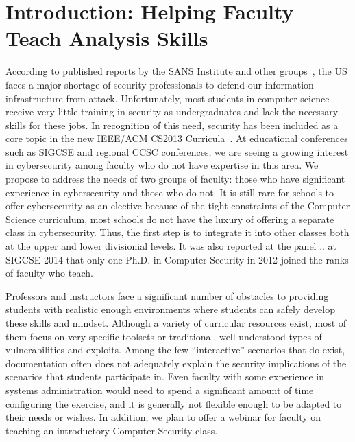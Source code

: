 

%


\section{Introduction: Helping Faculty Teach Analysis Skills}
\label{sec:intro}

According to published reports by the SANS Institute and other 
groups~\cite{defensenewsshortage}, the US faces a major shortage of 
security professionals to defend our information infrastructure from
attack.  Unfortunately, most students 
in computer science receive very little training in security as
undergraduates and lack the necessary skills 
for these jobs.  In recognition of this need, security has been included as
a core topic in the new 
IEEE/ACM CS2013 Curricula~\cite{acmcurriculum}.   At educational conferences such
as SIGCSE and regional CCSC conferences, we are seeing a growing interest 
in cybersecurity among faculty who do not have expertise in this area.
We propose to address the needs of two groups of faculty: those who have
significant experience in cybersecurity and those who do not.
It is still
rare for schools to offer cybersecurity as an elective
because of the tight 
constraints of the Computer Science curriculum, most schools 
do not have the luxury of offering a separate class in cybersecurity.  Thus, 
the first step is to integrate it into other classes both at the upper and lower divisionial
levels.  It was also reported at the panel .. at SIGCSE 2014 that only one Ph.D. in Computer
Security in 2012 joined the ranks of faculty who teach.

 Professors and instructors face a significant number of
obstacles to providing students with realistic enough environments
where students can safely develop these skills and mindset.  Although
a variety of curricular resources exist, most of them focus on very specific
toolsets or traditional, well-understood types of vulnerabilities and
exploits.  Among the few ``interactive'' scenarios that do exist, documentation
 often  does not adequately explain the
security implications of the scenarios that students participate in.  Even faculty
with some experience in systems administration would need to 
spend a significant amount of time configuring the exercise, and it is 
generally not flexible enough to be adapted to their needs or wishes.
In addition, we plan to offer a webinar for faculty on teaching an introductory 
Computer Security class.

